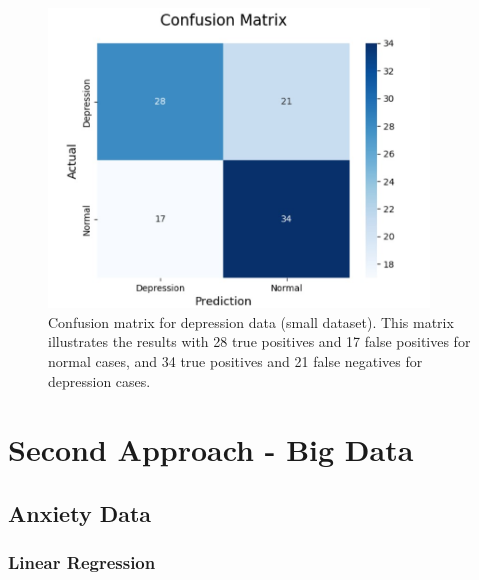 \documentclass[runningheads,a4paper,11pt]{report}
\begin{document}
\begin{figure}[h]
\centering
\includegraphics[width=0.9\textwidth]{Depression-Data-SmallData.jpg}
\caption[Confusion matrix for depression data (small dataset)]{Confusion matrix for depression data (small dataset). This matrix illustrates the results with 28 true positives and 17 false positives for normal cases, and 34 true positives and 21 false negatives for depression cases.}
\end{figure}

\vspace{1cm} %

\section{Second Approach - Big Data}
\label{section:second}

\subsection{Anxiety Data}
\label{section:anxietydata}

\subsubsection{Linear Regression}
\label{section:linear}
\end{document}
